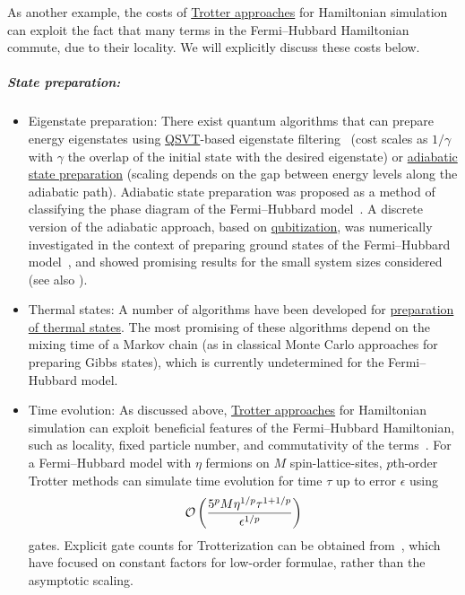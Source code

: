 \begin{refsection}
As another example, the costs of \hyperref[prim:ProductFormulae]{Trotter approaches} for Hamiltonian simulation can exploit the fact that many terms in the Fermi--Hubbard Hamiltonian commute, due to their locality. We will explicitly discuss these costs below.







\subparagraph{State preparation:} 
\begin{itemize}
    \item Eigenstate preparation: There exist quantum algorithms that can prepare energy eigenstates using \hyperref[prim:QSVT]{QSVT}-based eigenstate filtering~\cite{lin2020NearOptimalGroundState} (cost scales as $1/\gamma$ with $\gamma$ the overlap of the initial state with the desired eigenstate) or \hyperref[prim:QuantumAdiabaticAlgorithm]{adiabatic state preparation} (scaling depends on the gap between energy levels along the adiabatic path). Adiabatic state preparation was proposed as a method of classifying the phase diagram of the Fermi--Hubbard model~\cite{wecker2015StronglyCorrelated}. A discrete version of the adiabatic approach, based on \hyperref[prim:Qubitization]{qubitization}, was numerically investigated in the context of preparing ground states of the Fermi--Hubbard model~\cite{Lemieux2021_GS_prep}, and showed promising results for the small system sizes considered (see also \cite{tubman2018PostponingCatastrophe}).
    \item Thermal states: A number of algorithms have been developed for \hyperref[prim:GibbsSampling]{preparation of thermal states}. The most promising of these algorithms depend on the mixing time of a Markov chain (as in classical Monte Carlo approaches for preparing Gibbs states), which is currently undetermined for the Fermi--Hubbard model.  
    \item Time evolution: As discussed above, \hyperref[prim:ProductFormulae]{Trotter approaches} for Hamiltonian simulation can exploit beneficial features of the Fermi--Hubbard Hamiltonian, such as locality, fixed particle number, and commutativity of the terms~\cite{childs2019NearlyOptimalLattSim,clinton2021HamiltonianSimulationNearTermHubbard,su2021NearlyTightTrottInerElect}. For a Fermi--Hubbard model with $\eta$ fermions on $M$ spin-lattice-sites, $p$th-order Trotter methods can simulate time evolution for time $\tau$ up to error $\epsilon$ using
    \begin{equation}
        \mathcal{O}\left( \frac{5^p M \eta^{1/p} \tau^{1+1/p}}{\epsilon^{1/p}} \right)
    \end{equation}
    gates. Explicit gate counts for Trotterization can be obtained from~\cite{Kivlichan2020ImprovedFaultTolerantSimulationCondensedMatter,clinton2021HamiltonianSimulationNearTermHubbard,CampbellHubbard22,schubert2023trotterFermiHubbard}, which have focused on constant factors for low-order formulae, rather than the asymptotic scaling.


\end{itemize}
\end{refsection}
